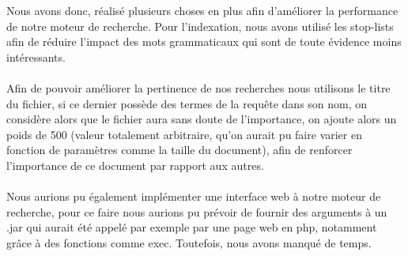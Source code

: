 \documentclass{article}
\begin{document}
Nous avons donc, réalisé plusieurs choses en plus afin d'améliorer la performance de notre moteur de recherche.
Pour l'indexation, nous avons utilisé les stop-lists afin de réduire l'impact des mots grammaticaux qui sont de toute évidence
moins intéressants.\\
\\
Afin de pouvoir améliorer la pertinence de nos recherches nous utilisons le titre du fichier, si ce dernier possède des termes de
la requête dans son nom, on considère alors que le fichier aura sans doute de l'importance, on ajoute alors un poids de 500 (valeur
totalement arbitraire, qu'on aurait pu faire varier en fonction de paramètres comme la taille du document), afin de renforcer l'importance de ce
document par rapport aux autres.\\
\\
Nous aurions pu également implémenter une interface web à notre moteur de recherche, pour ce faire nous aurions pu prévoir de fournir des arguments à un .jar
qui aurait été appelé par exemple par une page web en php, notamment grâce à des fonctions comme exec. Toutefois, nous avons manqué de temps.
\end{document}
